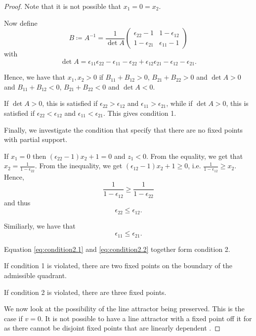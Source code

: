 \documentclass{article}
\theoremstyle{definition}
\theoremstyle{remark}
\begin{document}
\begin{proof}
Note that it is not possible that $x_1=0=x_2$.

Now define
\[
B\coloneqq A^{-1} = \frac{1}{\det A}
\begin{pmatrix}
\epsilon_{22}-1  &  1-\epsilon_{12} \\
1-\epsilon_{21}  &  \epsilon_{11}-1
\end{pmatrix}
\]
with \[\det A = \epsilon_{11}\epsilon_{22}-\epsilon_{11}-\epsilon_{22}+\epsilon_{12}\epsilon_{21}-\epsilon_{12}-\epsilon_{21}.\]

Hence, we have that $x_1,x_2>0$ if $B_{11}+B_{12}>0$, $B_{21}+B_{22}>0$ and $\det A >0$ 
and $B_{11}+B_{12}<0$, $B_{21}+B_{22}<0$ and $\det A <0$.

If $\det A >0$, this is satisfied if $\epsilon_{22}>\epsilon_{12}$ and $\epsilon_{11}>\epsilon_{21}$,
while if $\det A >0$, this is satisfied if $\epsilon_{22}<\epsilon_{12}$ and $\epsilon_{11}<\epsilon_{21}$.
This gives condition 1. %



Finally, we investigate the condition that specify that there are no fixed points with partial support.


If $x_1=0$ then $(\epsilon_{22}-1)x_2+1=0$ and $z_1<0$. 
From the equality, we get that $x_{2}=\frac{1}{1-\epsilon_{22}}$.
From the inequality, we get  $(\epsilon_{12}-1)x_2+1\geq 0$, i.e. $\frac{1}{1-\epsilon_{12}}\geq x_2$.
Hence, 
\begin{equation*}
\frac{1}{1-\epsilon_{12}}\geq\frac{1}{1-\epsilon_{22}}
\end{equation*}
and thus
\begin{equation}\label{eq:condition2.1}
\epsilon_{22} \leq \epsilon_{12}.
\end{equation}

Similiarly, we have that 
\begin{equation}\label{eq:condition2.2}
\epsilon_{11} \leq \epsilon_{21}.
\end{equation}

Equation \ref{eq:condition2.1} and \ref{eq:condition2.2} together form condition 2.

If condition 1 is violated, there are two fixed points on the boundary of the admissible quadrant.

If condition 2 is violated, there are three fixed points.


We now look at the possibility of the line attractor being preserved. 
This is the case if $v=0$.
It is not possible to have a line attractor with a fixed point off it for as there cannot be disjoint fixed points that are linearly dependent \citep[Lemma 5.2]{morrisonDiversityEmergentDynamics2022}.
\end{proof}
\end{document}
